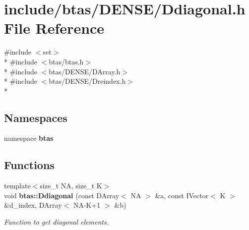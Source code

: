 \section{include/btas/\-D\-E\-N\-S\-E/\-Ddiagonal.h File Reference}
\label{df/db2/Ddiagonal_8h}
{\ttfamily \#include $<$set$>$}\\*
{\ttfamily \#include $<$btas/btas.\-h$>$}\\*
{\ttfamily \#include $<$btas/\-D\-E\-N\-S\-E/\-D\-Array.\-h$>$}\\*
{\ttfamily \#include $<$btas/\-D\-E\-N\-S\-E/\-Dreindex.\-h$>$}\\*
\subsection*{Namespaces}
\begin{DoxyCompactItemize}
\item 
namespace {\bf btas}
\end{DoxyCompactItemize}
\subsection*{Functions}
\begin{DoxyCompactItemize}
\item 
{\footnotesize template$<$size\-\_\-t N\-A, size\-\_\-t K$>$ }\\void {\bf btas\-::\-Ddiagonal} (const D\-Array$<$ N\-A $>$ \&a, const I\-Vector$<$ K $>$ \&d\-\_\-index, D\-Array$<$ N\-A-\/K+1 $>$ \&b)
\begin{DoxyCompactList}\small\item\em Function to get diagonal elements. \end{DoxyCompactList}\end{DoxyCompactItemize}
